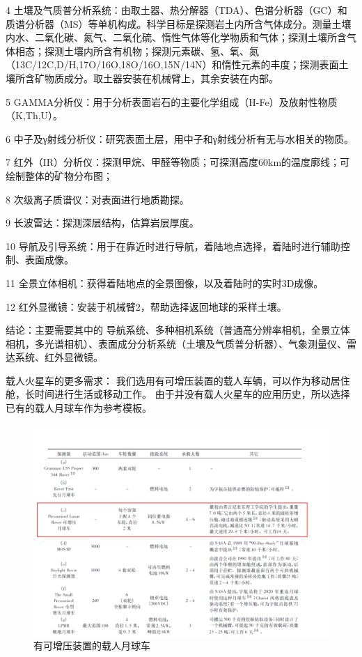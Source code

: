 4 土壤及气质普分析系统：由取土器、热分解器（TDA）、色谱分析器（GC）和质谱分析器（MS）等单机构成。科学目标是探测岩土内所含气体成分。测量土壤内水、二氧化碳、氮气、二氧化硫、惰性气体等化学物质和气体；探测土壤所含气体相态；探测土壤内所含有机物；探测元素碳、氢、氧、氮（13C/12C,D/H,17O/16O,18O/16O,15N/14N）和惰性元素的丰度；探测表面土壤所含矿物质成分。取土器安装在机械臂上，其余安装在内部。

5 GAMMA分析仪：用于分析表面岩石的主要化学组成（H-Fe）及放射性物质（K,Th,U）。

6 中子及γ射线分析仪：研究表面土层，用中子和γ射线分析有无与水相关的物质。

7 红外（IR）分析仪：探测甲烷、甲醛等物质；可探测高度60\si{\kilo\metre}的温度廓线；可绘制整体的矿物分布图；

8 次级离子质谱仪：对表面进行地质勘探。

9 长波雷达：探测深层结构，估算岩层厚度。

10 导航及引导系统：用于在靠近时进行导航，着陆地点选择，着陆时进行辅助控制、表面成像。

11 全景立体相机：获得着陆地点的全景图像，以及着陆时的实时3D成像。

12 红外显微镜：安装于机械臂2，帮助选择返回地球的采样土壤。

结论：主要需要其中的 导航系统、多种相机系统（普通高分辨率相机，全景立体相机，多光谱相机）、表面成分分析系统（土壤及气质普分析器）、气象测量仪、雷达系统、红外显微镜。

载人火星车的更多需求：
我们选用有可增压装置的载人车辆，可以作为移动居住舱，长时间进行生活或移动工作。
由于并没有载人火星车的应用历史，所以选择已有的载人月球车作为参考模板。

\begin{figure}[H]
  \centering
  \includegraphics[width=\textwidth]{figure/moon-cart.png}
  \caption{有可增压装置的载人月球车}
\end{figure}

